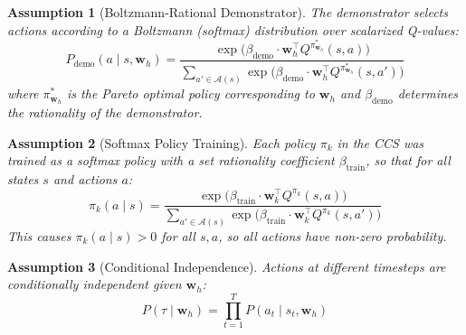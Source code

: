 \documentclass[11pt]{article}
\newtheorem{assumption}{Assumption}
\begin{document}
\begin{assumption}[Boltzmann-Rational Demonstrator]
\label{a:boltz}
The demonstrator selects actions according to a Boltzmann (softmax) distribution over scalarized Q-values:
\begin{equation}
    P_{\text{demo}}(a \mid s, \mathbf{w}_h) = \frac{\exp\!\big(\beta_{\text{demo}} \cdot \mathbf{w}_h^\top Q^{\pi^*_{\mathbf{w}_h}}(s, a)\big)}{\displaystyle\sum_{a' \in \mathcal{A}(s)} \exp\!\big(\beta_{\text{demo}} \cdot \mathbf{w}_h^\top Q^{\pi^*_{\mathbf{w}_h}}(s, a')\big)}
\end{equation}
where $\pi^*_{\mathbf{w}_h}$ is the Pareto optimal policy corresponding to $\mathbf{w}_h$ and $\beta_{\text{demo}}$ determines the rationality of the demonstrator.
\end{assumption}

\begin{assumption}[Softmax Policy Training]
\label{a:softmax}
Each policy $\pi_k$ in the CCS was trained as a softmax policy with a set rationality coefficient $\beta_{\text{train}}$, so that for all states $s$ and actions $a$:
\begin{equation}
\label{eq:softmax_policy}
    \pi_k(a \mid s) = \frac{\exp\!\big(\beta_{\text{train}} \cdot \mathbf{w}_k^\top Q^{\pi_k}(s, a)\big)}{\displaystyle\sum_{a' \in \mathcal{A}(s)} \exp\!\big(\beta_{\text{train}} \cdot \mathbf{w}_k^\top Q^{\pi_k}(s, a')\big)}
\end{equation}
This causes $\pi_k(a \mid s) > 0$ for all $s, a$, so all actions have non-zero probability.
\end{assumption}

\begin{assumption}[Conditional Independence]
\label{a:indep}
Actions at different timesteps are conditionally independent given $\mathbf{w}_h$:
\begin{equation}
    P(\tau \mid \mathbf{w}_h) = \prod_{t=1}^{T} P(a_t \mid s_t, \mathbf{w}_h)
\end{equation}
\end{assumption}

\end{document}
